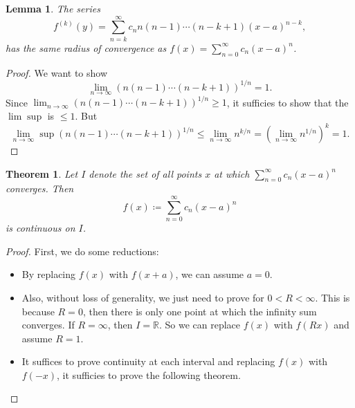 \documentclass[12pt]{article}
\theoremstyle{plain}
\newtheorem{thm}{Theorem}
\newtheorem*{lemma}{Lemma}
\theoremstyle{definition}
\begin{document}
\begin{lemma}
    The series 
    $$f^{(k)}(y)=\sum_{n=k}^\infty c_n n(n-1)\cdots (n-k+1)(x-a)^{n-k},$$
    has the same radius of convergence as $f(x)=\sum_{n=0}^\infty c_n(x-a)^n$.
\end{lemma}
\begin{proof}
    We want to show
    $$\lim_{n\rightarrow\infty}\left(n(n-1)\cdots(n-k+1)\right)^{1/n}=1.$$
    Since $\lim_{n\rightarrow\infty}\left(n(n-1)\cdots(n-k+1)\right)^{1/n}\geq1$,
    it sufficies to show that the $\lim\sup$ is $\leq 1$.
    But 
    $$\lim_{n\rightarrow\infty}\sup \left(n(n-1)\cdots(n-k+1)\right)^{1/n}\leq \lim_{n\rightarrow\infty}
    n^{k/n}=(\lim_{n\rightarrow\infty} n^{1/n})^k=1.$$
\end{proof}

\begin{thm}
    Let $I$ denote the set of all points $x$ at which $\sum_{n=0}^\infty c_n(x-a)^n$ converges.
    Then
    $$f(x)\coloneqq \sum_{n=0}^\infty c_n(x-a)^n$$
    is continuous on $I$.
\end{thm}
\begin{proof}
    First, we do some reductions:
    \begin{itemize}
        \item By replacing $f(x)$ with $f(x+a)$, we can assume $a=0$.
        \item Also, without loss of generality, we just need to prove for $0<R<\infty$.
        This is because $R=0$, then there is only one point at which the infinity sum converges.
        If $R=\infty$, then $I=\mathbb{R}$.
        So we can  replace $f(x)$ with $f(Rx)$ and assume $R=1$.
        \item It suffices to prove continuity at each interval and replacing $f(x)$ with $f(-x)$, it
        sufficies to prove the following theorem.
    \end{itemize}
\end{proof}
\end{document}
